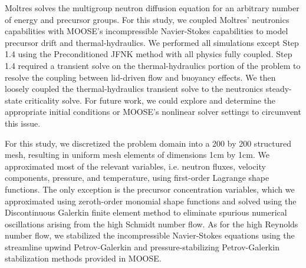 Moltres solves the multigroup neutron diffusion equation for an arbitrary
number of energy and precursor groups. For this study, we coupled Moltres'
neutronics capabilities with \gls{MOOSE}'s incompressible Navier-Stokes
capabilities \cite{peterson_overview_2017} to
model precursor drift and thermal-hydraulics. We performed all simulations
except Step 1.4 using the Preconditioned \gls{JFNK} method with all physics
fully coupled. Step 1.4 required a transient solve on the thermal-hydraulics
portion of the problem to resolve the coupling between lid-driven flow and
buoyancy effects. We then loosely coupled the thermal-hydraulics transient
solve to the neutronics steady-state criticality solve. For future work, we
could explore and determine the appropriate initial conditions or \gls{MOOSE}'s
nonlinear solver settings to circumvent this issue.

For this study, we discretized the problem domain into a 200 by 200 structured
mesh, resulting in uniform mesh elements of dimensions 1cm by 1cm. We
approximated most of the relevant variables, i.e. neutron fluxes, velocity
components, pressure, and temperature, using first-order Lagrange shape
functions. The only exception is the precursor concentration variables, which
we approximated using zeroth-order monomial shape functions and solved using
the Discontinuous Galerkin finite element method to eliminate spurious
numerical oscillations arising from the high Schmidt number flow. As for the
high Reynolds number flow, we stabilized the incompressible Navier-Stokes
equations using the streamline upwind Petrov-Galerkin and pressure-stabilizing
Petrov-Galerkin stabilization methods \cite{peterson_overview_2017} provided in
\gls{MOOSE}.
